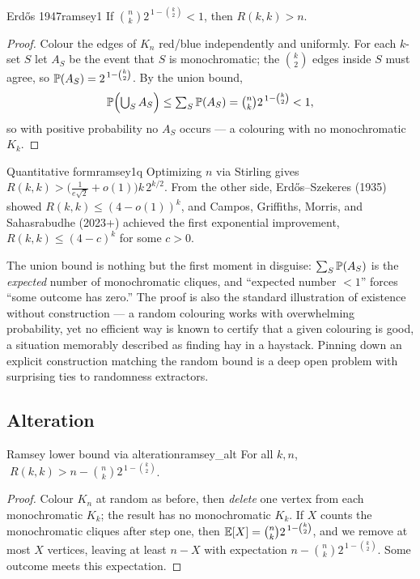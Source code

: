 \begin{theorem}{Erd\H{o}s 1947}{ramsey1}
If $\binom nk 2^{\,1-\binom k2}<1$, then $R(k,k)>n$.
\end{theorem}

\begin{proof}
Colour the edges of $K_n$ red/blue independently and uniformly. For each
$k$-set $S$ let $A_S$ be the event that $S$ is monochromatic; the
$\binom k2$ edges inside $S$ must agree, so $\mathbb{P}(A_S)=2^{\,1-\binom k2}$. By
the union bound,
\[
  \mathbb{P}\Bigl(\textstyle\bigcup_S A_S\Bigr)
  \le \sum_{S}\mathbb{P}(A_S)=\binom nk 2^{\,1-\binom k2}<1,
\]
so with positive probability no $A_S$ occurs --- a colouring with no
monochromatic $K_k$.
\end{proof}

\begin{remark}{Quantitative form}{ramsey1q}
Optimizing $n$ via Stirling gives
$R(k,k)>\bigl(\tfrac{1}{e\sqrt2}+o(1)\bigr)k\,2^{k/2}$. From the other side,
Erd\H{o}s--Szekeres (1935) showed $R(k,k)\le(4-o(1))^k$, and Campos,
Griffiths, Morris, and Sahasrabudhe (2023+) achieved the first exponential
improvement, $R(k,k)\le(4-c)^k$ for some $c>0$.
\end{remark}

\begin{insight}
The union bound is nothing but the first moment in disguise: $\sum_S\mathbb{P}(A_S)$
is the \emph{expected} number of monochromatic cliques, and ``expected number
$<1$'' forces ``some outcome has zero.'' The proof is also the standard
illustration of existence without construction --- a random colouring works
with overwhelming probability, yet no efficient way is known to certify that a
given colouring is good, a situation memorably described as finding hay in a
haystack. Pinning down an explicit construction matching the random bound is a
deep open problem with surprising ties to randomness extractors.
\end{insight}

\subsection*{Alteration}

\begin{theorem}{Ramsey lower bound via alteration}{ramsey_alt}
For all $k,n$, $\;R(k,k)>n-\binom nk 2^{\,1-\binom k2}$.
\end{theorem}

\begin{proof}
Colour $K_n$ at random as before, then \emph{delete} one vertex from each
monochromatic $K_k$; the result has no monochromatic $K_k$. If $X$ counts the
monochromatic cliques after step one, then $\mathbb{E}[X]=\binom nk 2^{\,1-\binom k2}$,
and we remove at most $X$ vertices, leaving at least $n-X$ with expectation
$n-\binom nk 2^{\,1-\binom k2}$. Some outcome meets this expectation.
\end{proof}

